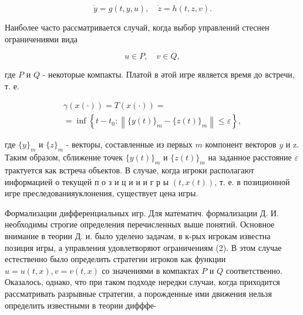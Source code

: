 \documentclass[10pt]{article}
\begin{document}
\[

\dot{y}=g(t, y, u), \quad \dot{z}=h(t, z, v) .

\]



Наиболее часто рассматривается случай, когда выбор управлений стеснен ограничениями вида



\[

u \in P, \quad v \in Q,

\]



где $P$ и $Q$ - некоторые компакты. Платой в әтой игре является время до встречи, т. е.



\[

\begin{gathered}

\gamma(x(\cdot))=T(x(\cdot))= \\

=\inf \left\{t-t_{0}:\left\|\{y(t)\}_{m}-\{z(t)\}_{m}\right\| \leqslant \varepsilon\right\},

\end{gathered}

\]



где $\{y\}_{m}$ и $\{z\}_{m}$ - векторы, составленные из первых $m$ компонент векторов $y$ и z. Таким образом, сближение точек $\{y(t)\}_{m}$ и $\{z(t)\}_{m}$ на заданное расстояние $\varepsilon$ трактуется как встреча объектов. В случае, когда игроки располагают информацией о текущей п о з и ц и и и г р ы $(t, x(t))$, т. е. в позиционной игре преследованияуклонения, существует цена игры.



Формализации дифференциальных игр. Для математич. формализации Д. И. необходимы строгие определения перечисленных выше понятий. Основное внимание в теории Д. и. было уделено задачам, в к-рых игрокам известна позиция игры, а управления удовлетворяют ограничениям (2). В этом случае естественно было определить стратегии игроков как функции $u=u(t, x), v=v(t, x)$ со значениями в компактах $P$ и $Q$ соответственно. Оказалось, однако, что при таком подходе нередки случаи, когда приходится рассматривать разрывные стратегии, а порожденные ими движения нельзя определить известными в теории дифффе-
\end{document}

